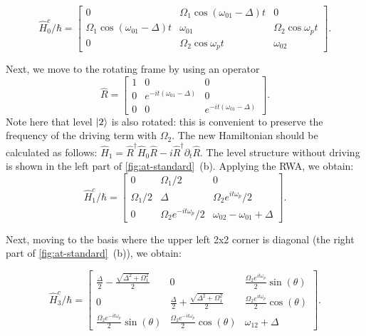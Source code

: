 \documentclass[%
 prx,
 amsmath,amssymb,
 reprint,%
]{revtex4-1}
\begin{document}
\begin{equation*}
\hat H^c_0/\hbar = \left[\begin{matrix}
0 & \Omega_{1} \cos{\left(\omega_{01}- \Delta \right)t} & 0\\
\Omega_{1} \cos{\left(\omega_{01} - \Delta \right)t}   & \omega_{01} &\Omega_{2} \cos\omega_p t  \\
0 & \Omega_{2} \cos{\omega_p t}  & \omega_{02}\end{matrix}\right].
\end{equation*}

Next, we move to the rotating frame by using an operator
\[
\hat R = \left[\begin{matrix} 
1 & 0 & 0\\0 & e^{- i t \left(\omega_{01}- \Delta\right)} & 0\\0 & 0 & e^{- i t \left(\omega_{01}- \Delta\right)}\end{matrix}\right].
\]
Note here that level $\ket{2}$ is also rotated: this is convenient to preserve the frequency of the driving term with $\Omega_2$. The new Hamiltonian should be calculated as follows: $\hat H_1 = \hat R^\dag \hat H_0 \hat R - i \hat{R}^\dag \partial_t  \hat R$. The level structure without driving  is shown in the left part of \autoref{fig:at-standard}~(b). Applying the RWA, we obtain:
\begin{equation*}
\hat H^c_1/\hbar = \left[\begin{matrix}0 &\Omega_{1}/2 & 0\\\Omega_{1}/2 & \Delta & \Omega_{2} e^{i t \omega_p}/2\\0 & \Omega_{2} e^{-i t \omega_p}/2 & \omega_{02} - \omega_{01}+\Delta \end{matrix}\right].
\end{equation*}

Next, moving to the basis where the upper left 2x2 corner is diagonal (the right part of \autoref{fig:at-standard}~(b)), we obtain:

\begin{equation*}
\hat H^c_3/\hbar = \left[\begin{matrix} 
\frac{\Delta}{2} - \frac{\sqrt{\Delta^{2} + \Omega_{1}^{2}}}{2} & 
0 &
\frac{\Omega_{2} e^{i t \omega_{p}}}{2}\sin(\theta)
\\
0 & 
\frac{\Delta}{2} + \frac{\sqrt{\Delta^{2} + \Omega_{1}^{2}}}{2} & 
\frac{\Omega_{2} e^ {i t \omega_p}}{2}\cos(\theta)
\\
\frac{\Omega_{2} e^{-i t \omega_{p}} }{2}\sin(\theta) & 
\frac{\Omega_{2} e^{-i t \omega_{p}}}{2} \cos(\theta) & 
\omega_{12} +\Delta 
\end{matrix}\right].
\end{equation*}
\end{document}
